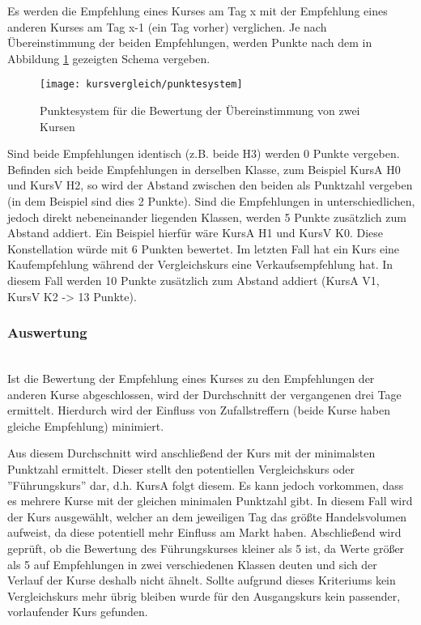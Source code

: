 Es werden die Empfehlung eines Kurses am Tag x mit der Empfehlung eines anderen Kurses am Tag x-1 (ein Tag vorher) verglichen. Je nach Übereinstimmung der beiden Empfehlungen, werden Punkte nach dem in Abbildung \ref{fig:punktesystem} gezeigten Schema vergeben.

\begin{figure}[!htb]
\centering
\texttt{[image: kursvergleich/punktesystem]}
\caption{Punktesystem für die Bewertung der Übereinstimmung von zwei Kursen}
\label{fig:punktesystem}
\end{figure}

Sind beide Empfehlungen identisch (z.B. beide H3) werden 0 Punkte vergeben. Befinden sich beide Empfehlungen in derselben Klasse, zum Beispiel KursA H0 und KursV H2, so wird der Abstand zwischen den beiden als Punktzahl vergeben (in dem Beispiel sind dies 2 Punkte). Sind die Empfehlungen in unterschiedlichen, jedoch direkt nebeneinander liegenden Klassen, werden 5 Punkte zusätzlich zum Abstand addiert. Ein Beispiel hierfür wäre KursA H1 und KursV K0. Diese Konstellation würde mit 6 Punkten bewertet. Im letzten Fall hat ein Kurs eine Kaufempfehlung während der Vergleichskurs eine Verkaufsempfehlung hat. In diesem Fall werden 10 Punkte zusätzlich zum Abstand addiert (KursA V1, KursV K2 -> 13 Punkte).

\subsubsection{Auswertung\nopunct}~\\
Ist die Bewertung der Empfehlung eines Kurses zu den Empfehlungen der anderen Kurse abgeschlossen, wird der Durchschnitt der vergangenen drei Tage ermittelt. Hierdurch wird der Einfluss von Zufallstreffern (beide Kurse haben gleiche Empfehlung) minimiert.

Aus diesem Durchschnitt wird anschließend der Kurs mit der minimalsten Punktzahl ermittelt. Dieser stellt den potentiellen Vergleichskurs oder ''Führungskurs'' dar, d.h. KursA folgt diesem. Es kann jedoch vorkommen, dass es mehrere Kurse mit der gleichen minimalen Punktzahl gibt. In diesem Fall wird der Kurs ausgewählt, welcher an dem jeweiligen Tag das größte Handelsvolumen aufweist, da diese potentiell mehr Einfluss am Markt haben. Abschließend wird geprüft, ob die Bewertung des Führungskurses kleiner als 5 ist, da Werte größer als 5 auf Empfehlungen in zwei verschiedenen Klassen deuten und sich der Verlauf der Kurse deshalb nicht ähnelt. Sollte aufgrund dieses Kriteriums kein Vergleichskurs mehr übrig bleiben wurde für den Ausgangskurs kein passender, vorlaufender Kurs gefunden.  

